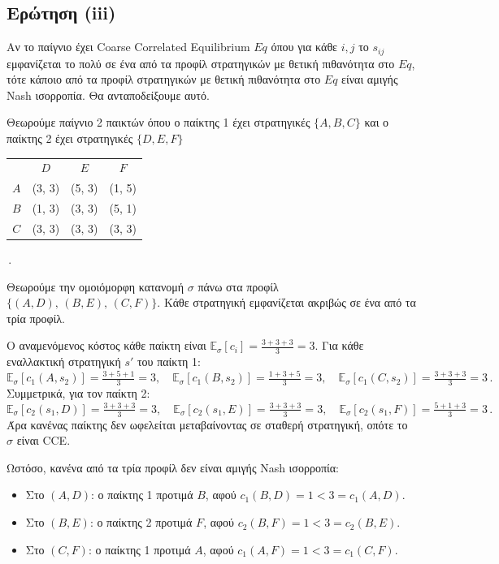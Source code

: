 \subsection{Ερώτηση (iii)}

Αν το παίγνιο έχει Coarse Correlated Equilibrium $Eq$ όπου για κάθε $i, j$ το
$s_{ij}$ εμφανίζεται το πολύ σε ένα από τα προφίλ στρατηγικών με θετική πιθανότητα
στο $Eq$, τότε κάποιο από τα προφίλ στρατηγικών με θετική πιθανότητα στο $Eq$
είναι αμιγής Nash ισορροπία. Θα ανταποδείξουμε αυτό.

Θεωρούμε παίγνιο 2 παικτών όπου ο παίκτης 1 έχει στρατηγικές $\{A, B, C\}$ και
ο παίκτης 2 έχει στρατηγικές $\{D, E, F\}$

\begin{center}
\begin{tabular}{cccc}
        & $D$ & $E$ & $F$ \\
  $A$   & (3, 3)   & (5, 3)   & (1, 5)   \\
  $B$   & (1, 3)   & (3, 3)   & (5, 1)   \\
  $C$   & (3, 3)   & (3, 3)   & (3, 3)   \\
\end{tabular}
\,.
\end{center}

Θεωρούμε την ομοιόμορφη κατανομή $\sigma$ πάνω στα προφίλ
$\{(A,D),\, (B,E),\, (C,F)\}$. Κάθε στρατηγική εμφανίζεται ακριβώς σε ένα από τα
τρία προφίλ.

Ο αναμενόμενος κόστος κάθε παίκτη είναι
$\mathbb{E}_\sigma[c_i] = \frac{3+3+3}{3} = 3$.
Για κάθε εναλλακτική στρατηγική $s'$ του παίκτη 1:
$$
    \mathbb{E}_\sigma[c_1(A, s_2)] = \tfrac{3+5+1}{3} = 3, \quad
    \mathbb{E}_\sigma[c_1(B, s_2)] = \tfrac{1+3+5}{3} = 3, \quad
    \mathbb{E}_\sigma[c_1(C, s_2)] = \tfrac{3+3+3}{3} = 3 \,.
$$
Συμμετρικά, για τον παίκτη 2:
$$
    \mathbb{E}_\sigma[c_2(s_1, D)] = \tfrac{3+3+3}{3} = 3, \quad
    \mathbb{E}_\sigma[c_2(s_1, E)] = \tfrac{3+3+3}{3} = 3, \quad
    \mathbb{E}_\sigma[c_2(s_1, F)] = \tfrac{5+1+3}{3} = 3 \,.
$$
Άρα κανένας παίκτης δεν ωφελείται μεταβαίνοντας σε σταθερή στρατηγική, οπότε
το $\sigma$ είναι CCE.

Ωστόσο, κανένα από τα τρία προφίλ δεν είναι αμιγής Nash ισορροπία:
\begin{itemize}
    \item Στο $(A,D)$: ο παίκτης 1 προτιμά $B$, αφού $c_1(B,D) = 1 < 3 = c_1(A,D)$.
    \item Στο $(B,E)$: ο παίκτης 2 προτιμά $F$, αφού $c_2(B,F) = 1 < 3 = c_2(B,E)$.
    \item Στο $(C,F)$: ο παίκτης 1 προτιμά $A$, αφού $c_1(A,F) = 1 < 3 = c_1(C,F)$.
\end{itemize}
